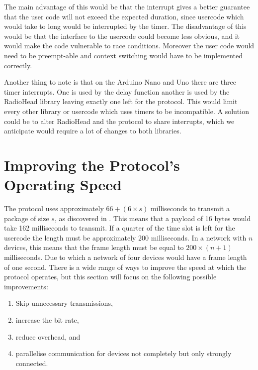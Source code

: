 The main advantage of this would be that the interrupt gives a better guarantee that the user code will not exceed the expected duration, since usercode which would take to long would be interrupted by the timer.
The disadvantage of this would be that the interface to the usercode could become less obvious, and it would make the code vulnerable to race conditions.
Moreover the user code would need to be preempt-able and context switching would have to be implemented correctly.

Another thing to note is that on the Arduino Nano and Uno there are three timer interrupts.
One is used by the delay function another is used by the RadioHead library leaving exactly one left for the protocol.
This would limit every other library or usercode which uses timers to be incompatible.
A solution could be to alter RadioHead and the protocol to share interrupts, which we anticipate would require a lot of changes to both libraries.

\section{Improving the Protocol's Operating Speed}
The protocol uses approximately $66 + (6 \times s)$ milliseconds to transmit a package of size $s$, as discovered in . 
This means that a payload of 16 bytes would take 162 milliseconds to transmit.
If a quarter of the time slot is left for the usercode the length must be approximately 200 milliseconds.
In a network with $n$ devices, this means that the frame length must be equal to $200 \times (n + 1)$ milliseconds.
Due to which a network of four devices would have a frame length of one second.
There is a wide range of ways to improve the speed at which the protocol operates, but this section will focus on the following possible improvements:
\begin{enumerate}[label=\itshape \alph*\upshape)]
    \item Skip unnecessary transmissions,
    \item increase the bit rate, 
    \item reduce overhead, and
    \item parallelise communication for devices not completely but only strongly connected.
\end{enumerate} 

